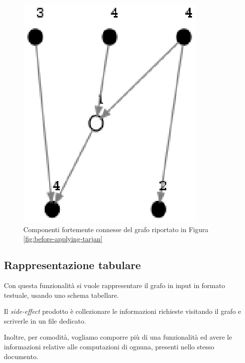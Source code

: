 \begin{figure}
  \centering
  \includegraphics{images/OnePipingLevelUnitTest_Printer_DFS_PrinterPipe_Crescenzi-phase-PrinterPipeFilter-level-2.eps}
  \caption{Componenti fortemente connesse del grafo riportato in
    Figura \ref{fig:before-applying-tarjan}}
  \label{fig:tarjan-output}
\end{figure}

\subsection{Rappresentazione tabulare}
Con questa funzionalit\`a si vuole rappresentare il grafo in input in
formato testuale, usando uno schema tabellare.

Il \emph{side-effect} prodotto \`e collezionare le informazioni
richieste visitando il grafo e scriverle in un file dedicato.

Inoltre, per comodit\`a, vogliamo comporre pi\`u di una funzionalit\`a
ed avere le informazioni relative alle computazioni di ognuna,
presenti nello stesso documento.

